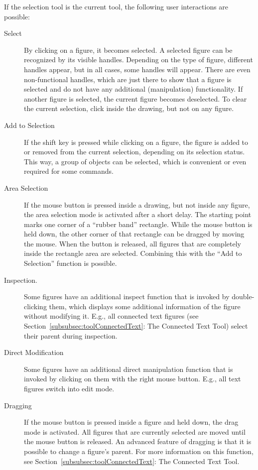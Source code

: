 If the selection tool is the current tool, the following user interactions
are possible:
\begin{description}
\item[Select] By clicking on a figure, it becomes selected.
A selected figure can be recognized by its visible handles.
Depending on the type of figure, different handles appear, but in
all cases, some handles will appear. There are even non-functional
handles, which are just there to show that a figure is selected and
do not have any additional (manipulation) functionality.
If another figure is selected, the current figure becomes deselected.
To clear the current selection, click inside the drawing, but not on any
figure.
\item[Add to Selection] If the shift key is pressed while clicking on a
figure, the figure is added to or removed from the current selection,
depending on its selection status.
This way, a group of objects can be selected, which
is convenient or even required for some commands.
\item[Area Selection] If the mouse button is pressed inside a drawing, but
not inside any figure, the area selection mode is activated after a short
delay.
The starting point marks one corner of a ``rubber band'' rectangle.
While the mouse button is held down, the other corner of that rectangle can be
dragged by moving the mouse.
When the button is released, all figures that are completely inside the
rectangle area are selected.
Combining this with the ``Add to Selection'' function is possible.
\item[Inspection.] Some figures have an additional inspect
function that is invoked by double-clicking them, which displays some
additional information of the figure without modifying it.
E.g., all connected text figures (see
Section~\ref{subsubsec:toolConnectedText}:
The Connected Text Tool) select their parent during inspection.
\item[Direct Modification] Some figures have an additional direct
manipulation function that is invoked by
clicking on them with the right mouse button.
E.g., all text figures switch into edit mode.
\item[Dragging] If the mouse button is pressed inside a figure and held down,
the drag mode is activated. All figures that are currently selected are moved
until the mouse button is released.
An advanced feature of dragging is that it is possible to change a
figure's parent. For more information on this function, see
Section~\ref{subsubsec:toolConnectedText}: The Connected Text Tool.

\end{description}

